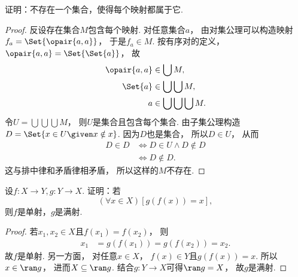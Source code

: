 \begin{example}
    证明：不存在一个集合，使得每个映射都属于它.
    \begin{proof}
        反设存在集合\(M\)包含每个映射.
        对任意集合\(a\)，
        由对集公理可以构造映射\(f_a=\Set{\opair{a,a}}\)，
        于是\(f_a\in M\).
        按有序对的定义，
        \(\opair{a,a}=\Set{\Set{a}}\)，
        故
        \begin{align*}
            \opair{a,a} &\in\bigcup M, \\
            \Set{a} &\in\bigcup\bigcup M, \\
            a &\in\bigcup\bigcup\bigcup M.
        \end{align*}
        令\(U=\bigcup\bigcup\bigcup M\)，
        则\(U\)是集合且包含每个集合.
        由子集公理构造\(D=\Set{x\in U\given x\notin x}\).
        因为\(D\)也是集合，
        所以\(D\in U\)，
        从而
        \begin{align*}
            D\in D &\iff D\in U\land D\notin D \\
            &\iff D\notin D.
        \end{align*}
        这与排中律和矛盾律相矛盾，
        所以这样的\(M\)不存在.
    \end{proof}
\end{example}

\begin{example}
    设\(f\colon X \to Y,
    g\colon Y \to X\).
    证明：若
    \begin{equation*}
        (\forall x \in X)[g(f(x)) = x],
    \end{equation*}
    则\(f\)是单射，\(g\)是满射.
    \begin{proof}
        若\(x_1,x_2\in X\)且\(f(x_1)=f(x_2)\)，
        则
        \begin{align*}
            x_1 &=g(f(x_1))=g(f(x_2))=x_2.
        \end{align*}
        故\(f\)是单射.
        另一方面，
        对任意\(x\in X\)，
        \(f(x)\in Y\)且\(g(f(x))=x\).
        所以\(x\in\ran g\)，
        进而\(X\subseteq\ran g\).
        结合\(g\colon Y\to X\)可得\(\ran g=X\)，
        故\(g\)是满射.
    \end{proof}
\end{example}

